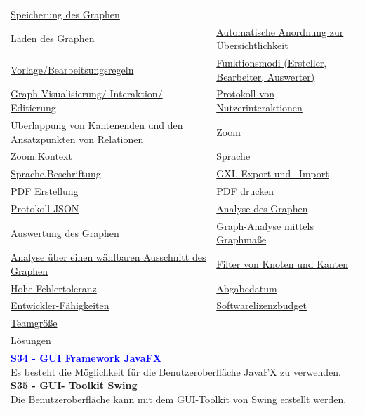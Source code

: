 \documentclass[enabledeprecatedfontcommands,fontsize=11pt,paper=a4,twoside]{scrartcl}
\newcounter{one}
\newcommand{\cb}[1]{{\textcolor{blue}{#1}}}
\begin{document}
\begin{tabular} {|p{8cm} p{8cm}|}
	\hyperlink {v}{Speicherung des Graphen} \\
	\hyperlink {w}{Laden des Graphen} &
	\hyperlink {x}{Automatische Anordnung zur Übersichtlichkeit} \\
	\hyperlink {y}{Vorlage/Bearbeitsungsregeln} &
	\hyperlink {z}{Funktionsmodi (Ersteller, Bearbeiter, Auswerter)} \\
	\hyperlink {aa}{Graph Visualisierung/ Interaktion/ Editierung}&
	\hyperlink {bb}{Protokoll von Nutzerinteraktionen} \\
	\hyperlink {cc}{Überlappung von Kantenenden und den Ansatzpunkten von Relationen} &
	\hyperlink {ee}{Zoom} \\
	\hyperlink {ff}{Zoom.Kontext} &
	\hyperlink {gg}{Sprache} \\
	\hyperlink {hh}{Sprache.Beschriftung} &
	\hyperlink {jj}{GXL-Export und –Import} \\
	\hyperlink {kk}{PDF Erstellung} &
	\hyperlink {ll}{PDF drucken} \\
	\hyperlink {mm}{Protokoll JSON} &
	\hyperlink {oo}{Analyse des Graphen} \\
	\hyperlink {pp}{Auswertung des Graphen} &
	\hyperlink {qq}{Graph-Analyse mittels Graphmaße} \\ 
	\hyperlink {rr}{Analyse über einen wählbaren Ausschnitt des Graphen} &
	\hyperlink {ss}{Filter von Knoten und Kanten} \\
	\hyperlink {tt}{Hohe Fehlertoleranz} &
	\hyperlink {uu}{Abgabedatum} \\
	\hyperlink {vv}{Entwickler-Fähigkeiten} &
	\hyperlink {ww}{Softwarelizenzbudget} \\
	\hyperlink {xx}{Teamgröße} &
	\\ \hline
	\multicolumn{2}{|l|}{Lösungen} \\
	\multicolumn{2}{|l|}{\parbox{16cm}{
			\textbf{\cb{\hypertarget{kkk}{S34 - GUI Framework JavaFX}}} \\
			Es besteht die Möglichkeit für die Benutzeroberfläche JavaFX zu verwenden.  \\
			\textbf{S35 - GUI- Toolkit Swing} \\
			Die Benutzeroberfläche kann mit dem GUI-Toolkit von Swing erstellt werden.
	} }\\ \hline

\end{tabular}\\ \\ \\
\end{document}
